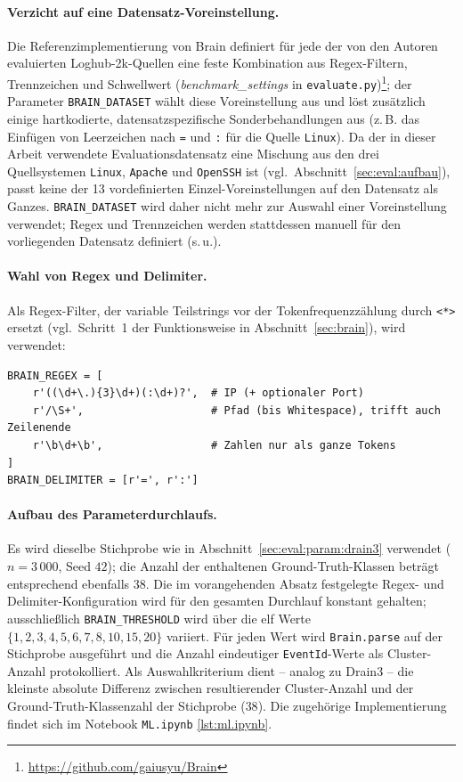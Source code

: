 \paragraph{Verzicht auf eine Datensatz-Voreinstellung.}
Die Referenzimplementierung von Brain definiert für jede der von den Autoren
evaluierten Loghub-2k-Quellen eine feste Kombination aus Regex-Filtern,
Trennzeichen und Schwellwert (\textit{benchmark\_settings} in
\texttt{evaluate.py})\footnote{\url{https://github.com/gaiusyu/Brain}}; der
Parameter \texttt{BRAIN\_DATASET} wählt diese Voreinstellung aus und löst
zusätzlich einige hartkodierte, datensatzspezifische Sonderbehandlungen aus
(z.\,B. das Einfügen von Leerzeichen nach \texttt{=} und \texttt{:} für die
Quelle \texttt{Linux}). Da der in dieser Arbeit verwendete
Evaluationsdatensatz eine Mischung aus den drei Quellsystemen
\texttt{Linux}, \texttt{Apache} und \texttt{OpenSSH} ist (vgl.\
Abschnitt~\ref{sec:eval:aufbau}), passt keine der 13 vordefinierten
Einzel-Voreinstellungen auf den Datensatz als Ganzes. \texttt{BRAIN\_DATASET}
wird daher nicht mehr zur Auswahl einer Voreinstellung verwendet; Regex und
Trennzeichen werden stattdessen manuell für den vorliegenden Datensatz
definiert (s.\,u.).

\paragraph{Wahl von Regex und Delimiter.}
Als Regex-Filter, der variable Teilstrings vor der Tokenfrequenzzählung durch
\texttt{<*>} ersetzt (vgl.\ Schritt~1 der Funktionsweise in
Abschnitt~\ref{sec:brain}), wird verwendet:

\begin{lstlisting}[caption={Regex-Filter und Trennzeichen für Brain}, label={lst:brain-regex}]
BRAIN_REGEX = [
    r'((\d+\.){3}\d+)(:\d+)?',  # IP (+ optionaler Port)
    r'/\S+',                    # Pfad (bis Whitespace), trifft auch Zeilenende
    r'\b\d+\b',                 # Zahlen nur als ganze Tokens
]
BRAIN_DELIMITER = [r'=', r':']
\end{lstlisting}


\paragraph{Aufbau des Parameterdurchlaufs.}
Es wird dieselbe Stichprobe wie in Abschnitt~\ref{sec:eval:param:drain3}
verwendet ($n = 3\,000$, Seed $42$); die Anzahl der enthaltenen
Ground-Truth-Klassen beträgt entsprechend ebenfalls $38$. Die im
vorangehenden Absatz festgelegte Regex- und Delimiter-Konfiguration wird für
den gesamten Durchlauf konstant gehalten; ausschließlich
\texttt{BRAIN\_THRESHOLD} wird über die elf Werte $\{1, 2, 3, 4, 5, 6, 7, 8,
10, 15, 20\}$ variiert. Für jeden Wert wird \texttt{Brain.parse} auf der
Stichprobe ausgeführt und die Anzahl eindeutiger \texttt{EventId}-Werte als
Cluster-Anzahl protokolliert. Als Auswahlkriterium dient -- analog zu Drain3
-- die kleinste absolute Differenz zwischen resultierender Cluster-Anzahl und
der Ground-Truth-Klassenzahl der Stichprobe ($38$). Die zugehörige
Implementierung findet sich im Notebook \texttt{ML.ipynb} \ref{lst:ml.ipynb}.

